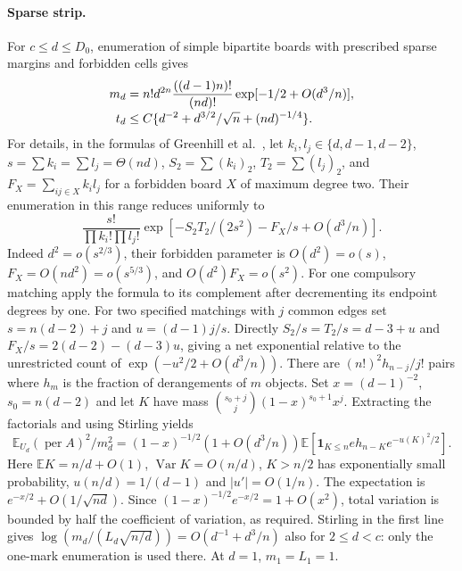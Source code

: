 \paragraph{Sparse strip.}
For $c\le d\le D_0$, enumeration of simple bipartite boards with
prescribed sparse margins and forbidden cells gives
\begin{align}
 m_d&=n!d^{2n}\frac{((d-1)n)!}{(nd)!}
                      \exp[-1/2+O(d^3/n)],\notag\\[-1mm]
 t_d&\le C\{d^{-2}+d^{3/2}/\sqrt n+(nd)^{-1/4}\}.\label{eq:inc-sparse}
\end{align}
For details, in the formulas of Greenhill et al.\ \cite[Theorems~2.1--2.2]{GHIM}, let
$k_i,l_j\in\{d,d-1,d-2\}$, $s=\sum k_i=\sum l_j=\Theta(nd)$,
$S_2=\sum(k_i)_2$, $T_2=\sum(l_j)_2$, and
$F_X=\sum_{ij\in X} k_i l_j$ for a forbidden board $X$ of maximum
degree two. Their enumeration in this range reduces uniformly to
\[
 \frac{s!}{\prod k_i!\prod l_j!}
 \exp[-S_2T_2/(2s^2)-F_X/s+O(d^3/n)].
\]
Indeed $d^2=o(s^{2/3})$, their forbidden parameter is $O(d^2)=o(s)$,
$F_X=O(nd^2)=o(s^{5/3})$, and $O(d^2)F_X=o(s^2)$.
For one compulsory matching apply the formula to its complement after
decrementing its endpoint degrees by one. For two specified matchings
with $j$ common edges set $s=n(d-2)+j$ and $u=(d-1)j/s$.
Directly $S_2/s=T_2/s=d-3+u$ and
$F_X/s=2(d-2)-(d-3)u$, giving a net exponential relative to the
unrestricted count of $\exp(-u^2/2+O(d^3/n))$. There are
$(n!)^2 h_{n-j}/j!$ pairs where $h_m$ is the fraction of derangements
of $m$ objects. Set $x=(d-1)^{-2}$, $s_0=n(d-2)$ and let $K$ have
mass $\binom{s_0+j}{j}(1-x)^{s_0+1}x^j$. Extracting the factorials
and using Stirling yields
\[
 \mathbb E_{U_d}(\operatorname{per}A)^2/m_d^2
 =(1-x)^{-1/2}(1+O(d^3/n))
 \mathbb E[\mathbf1_{K\le n}e h_{n-K}e^{-u(K)^2/2}].
\]
Here $\mathbb EK=n/d+O(1)$, $\operatorname{Var}K=O(n/d)$, $K>n/2$
has exponentially small probability, $u(n/d)=1/(d-1)$ and
$|u'|=O(1/n)$. The expectation is $e^{-x/2}+O(1/\sqrt{nd})$.
Since $(1-x)^{-1/2}e^{-x/2}=1+O(x^2)$, total variation is bounded
by half the coefficient of variation, as required. Stirling in the
first line gives
$\log(m_d/(L_d\sqrt{n/d}))=O(d^{-1}+d^3/n)$ also for $2\le d<c$:
only the one-mark enumeration is used there. At $d=1$, $m_1=L_1=1$.

